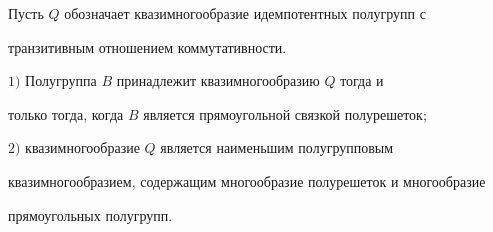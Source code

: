 Пусть $Q$ обозначает квазимногообразие идемпотентных полугрупп с


транзитивным отношением коммутативности.





\begin{thm}


$1)$ Полугруппа $B$ принадлежит квазимногообразию $Q$ тогда и


только тогда, когда $B$ является прямоугольной связкой полурешеток$;$





$2)$ квазимногообразие $Q$ является наименьшим полугрупповым


квазимногообразием, содержащим многообразие полурешеток и многообразие


прямоугольных полугрупп.


\end{thm}





